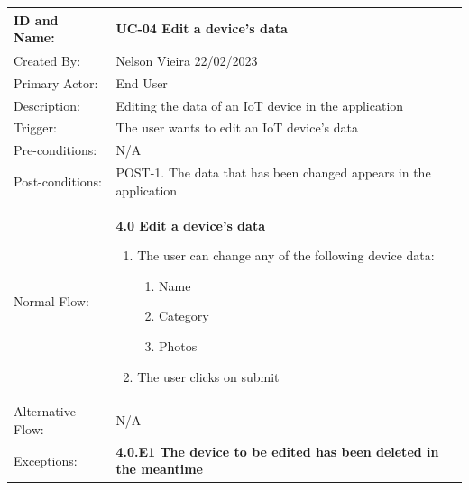 \documentclass{scrreprt}
\begin{document}
\begin{table}[H]
    \centering
    \begin{adjustbox}{width=1.1\textwidth,center=\textwidth}
        \begin{tabular}{|m{4cm}|m{12cm}|}
            \hline
            ID and Name: & UC-04 Edit a device's data \\
            \hline
            Created By: & Nelson Vieira 22/02/2023 \\
            \hline
            Primary Actor: & End User \\
            \hline
            Description: & Editing the data of an IoT device in the application \\
            \hline
            Trigger: & The user wants to edit an IoT device's data \\
            \hline
            Pre-conditions: & N/A \\
            \hline
            Post-conditions: & POST-1. The data that has been changed appears in the application \\
            \hline
            Normal Flow: & \textbf{4.0 Edit a device's data}
            \begin{enumerate}
                \item The user can change any of the following device data:
                \begin{enumerate}
                    \item Name
                    \item Category
                    \item Photos
                \end{enumerate}
                \item The user clicks on submit
            \end{enumerate} \\
            \hline
            Alternative Flow: & N/A \\
            \hline
            Exceptions: &
            \textbf{4.0.E1  The device to be edited has been deleted in the meantime}

\end{tabular}
\end{adjustbox}
\end{table}
\end{document}
